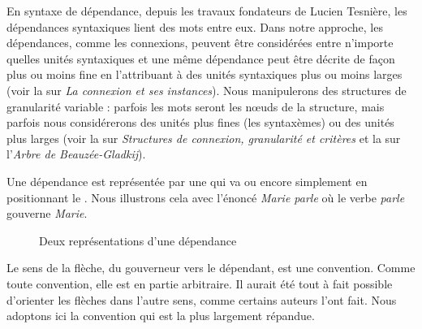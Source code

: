 En syntaxe de dépendance, depuis les travaux fondateurs de Lucien Tesnière, les dépendances syntaxiques lient des mots entre eux. Dans notre approche, les dépendances, comme les connexions, peuvent être considérées entre n’importe quelles unités syntaxiques et une même dépendance peut être décrite de façon plus ou moins fine en l’attribuant à des unités syntaxiques plus ou moins larges (voir la  sur \textit{La connexion et ses instances}). Nous manipulerons des structures de granularité variable : parfois les mots seront les nœuds de la structure, mais parfois nous considérerons des unités plus fines (les syntaxèmes) ou des unités plus larges (voir la  sur \textit{Structures de connexion, granularité et critères} et la  sur l’\textit{Arbre de Beauzée-Gladkij}).

Une dépendance est représentée par une  qui va  ou encore simplement en positionnant le . Nous illustrons cela avec l’énoncé \textit{Marie parle} où le verbe \textit{parle} gouverne \textit{Marie}.

\begin{figure}
\hspace{2cm}
\caption{\label{fig:}Deux représentations d’une dépendance}
\end{figure}

Le sens de la flèche, du gouverneur vers le dépendant, est une convention. Comme toute convention, elle est en partie arbitraire. Il aurait été tout à fait possible d’orienter les flèches dans l’autre sens, comme certains auteurs l’ont fait. Nous adoptons ici la convention qui est la plus largement répandue.

